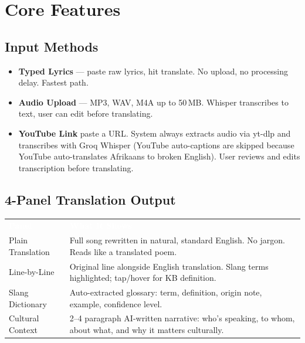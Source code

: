 \documentclass[12pt, a4paper]{article}
\begin{document}
\section{Core Features}

\subsection{Input Methods}

\begin{itemize}
  \item \textbf{Typed Lyrics} — paste raw lyrics, hit translate. No upload,
        no processing delay. Fastest path.
  \item \textbf{Audio Upload} — MP3, WAV, M4A up to 50\,MB. Whisper
        transcribes to text, user can edit before translating.
  \item \textbf{YouTube Link} \textemdash{} paste a URL. System always extracts audio
        via yt-dlp and transcribes with Groq Whisper (YouTube auto-captions are
        skipped because YouTube auto-translates Afrikaans to broken English).
        User reviews and edits transcription before translating.
\end{itemize}

\subsection{4-Panel Translation Output}

\renewcommand{\arraystretch}{1.5}
\begin{center}
\begin{tabular}{L{3.5cm} L{10cm}}
  \textcolor{white}{\textbf{Panel}} &
  \textcolor{white}{\textbf{What It Shows}} \\
  Plain Translation &
  Full song rewritten in natural, standard English. No jargon. Reads like a translated poem. \\
  Line-by-Line &
  Original line alongside English translation. Slang terms highlighted; tap/hover for KB definition. \\
  Slang Dictionary &
  Auto-extracted glossary: term, definition, origin note, example, confidence level. \\
  Cultural Context &
  2--4 paragraph AI-written narrative: who's speaking, to whom, about what, and why it matters culturally. \\
\end{tabular}
\end{center}
\end{document}
